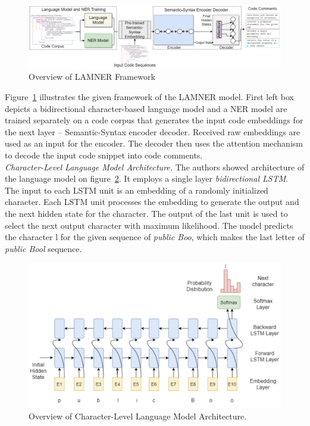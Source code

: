 \documentclass{article}
\begin{document}
\begin{figure}[!tbh]
    \centering
    \includegraphics[width=1.0\linewidth]{lamner.png}
    \caption{Overview of LAMNER Framework}
    \label{fig:lamner}
\end{figure}

{Figure}~\ref{fig:lamner} illustrates the given framework of the LAMNER model. First left box depicts a bidirectional character-based language model and a NER model are trained separately on a code corpus that generates the input code embeddings for the next layer – Semantic-Syntax encoder decoder. Received raw embeddings are used as an input for the encoder. The decoder then uses the attention mechanism to decode the input code snippet into code comments.\\

\textit{Character-Level Language Model Architecture.} The authors showed architecture of the language model on figure~\ref{fig:bilstm}. It employs a single layer \textit{bidirectional LSTM}. The input to each LSTM unit is an embedding of a randomly initialized character. Each LSTM unit processes the embedding to generate the output and the next hidden state for the character. The output of the last unit is used to select the next output character with maximum likelihood. The model predicts the character l for the given sequence of \textit{public Boo}, which makes the last letter of \textit{public Bool} sequence.

\begin{figure}[h]
    \centering
    \includegraphics[width=1.0\linewidth]{bilstm.png}
    \caption{Overview of Character-Level Language Model Architecture.}
    \label{fig:bilstm}
\end{figure}
\end{document}
